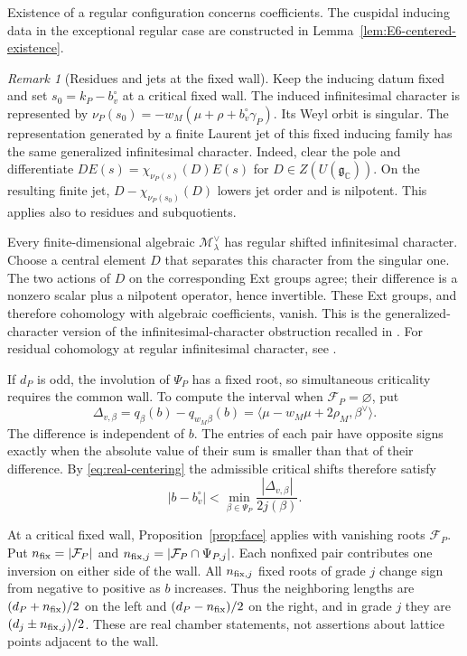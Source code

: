 \documentclass[12pt]{amsart}
\numberwithin{equation}{section}
\theoremstyle{plain}
\theoremstyle{definition}
\theoremstyle{remark}
\newtheorem{remark}[theorem]{Remark}
\newcommand{\C}{\mathbb C}
\newcommand{\cM}{\mathcal M}
\begin{document}
Existence of a regular configuration concerns coefficients. The cuspidal inducing data in the exceptional regular case are constructed in Lemma~\ref{lem:E6-centered-existence}.

\begin{remark}[Residues and jets at the fixed wall]\label{rem:wall-jets} 
Keep the inducing datum fixed and set $s_0=k_P-b_v^\circ$ at a critical fixed wall. The induced infinitesimal character is represented by $\nu_P(s_0)=-w_M(\mu+\rho+b_v^\circ\gamma_P)$. Its Weyl orbit is singular. The representation generated by a finite Laurent jet of this fixed inducing family has the same generalized infinitesimal character. Indeed, clear the pole and differentiate $DE(s)=\chi_{\nu_P(s)}(D)E(s)$ for $D\in Z(U(\mathfrak g_\C))$. On the resulting finite jet, $D-\chi_{\nu_P(s_0)}(D)$ lowers jet order and is nilpotent. This applies also to residues and subquotients.

Every finite-dimensional algebraic $\cM_\lambda^\vee$ has regular shifted infinitesimal character. Choose a central element $D$ that separates this character from the singular one. The two actions of $D$ on the corresponding Ext groups agree; their difference is a nonzero scalar plus a nilpotent operator, hence invertible. These Ext groups, and therefore cohomology with algebraic coefficients, vanish. This is the generalized-character version of the infinitesimal-character obstruction recalled in \cite[Ch.~I, Th.~5.3(ii)]{BorelWallach}. For residual cohomology at regular infinitesimal character, see \cite{GrbacSchwermer2010}. 
\end{remark}


If $d_P$ is odd, the involution of $\Psi_P$ has a fixed root, so simultaneous criticality requires the common wall. To compute the interval when $\mathcal F_P=\varnothing$, put
\begin{equation}\label{eq:delta}
 \Delta_{v,\beta}=q_\beta(b)-q_{w_M\beta}(b)
   =\langle\mu-w_M\mu+2\rho_M,\beta^\vee\rangle .
\end{equation}
The difference is independent of $b$. The entries of each pair have opposite signs exactly when the absolute value of their sum is smaller than that of their difference. By \eqref{eq:real-centering} the admissible critical shifts therefore satisfy
\[
 |b-b_v^\circ|<\min_{\beta\in\Psi_P}
                   \frac{|\Delta_{v,\beta}|}{2j(\beta)} .
\]

At a critical fixed wall, Proposition~\ref{prop:face} applies with vanishing roots $\mathcal F_P$. Put $n_{\rm fix}=|\mathcal F_P|$ and $n_{{\rm fix},j}=|\mathcal F_P\cap\Psi_{P,j}|$. Each nonfixed pair contributes one inversion on either side of the wall. All $n_{{\rm fix},j}$ fixed roots of grade $j$ change sign from negative to positive as $b$ increases. Thus the neighboring lengths are $(d_P+n_{\rm fix})/2$ on the left and $(d_P-n_{\rm fix})/2$ on the right, and in grade $j$ they are $(d_j\pm n_{{\rm fix},j})/2$. These are real chamber statements, not assertions about lattice points adjacent to the wall. 
\end{document}

